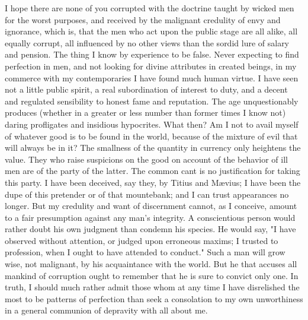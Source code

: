 I hope there are none of you corrupted with the doctrine taught by wicked men for the worst purposes, and received by the malignant credulity of envy and ignorance, which is, that the men who act upon the public stage are all alike, all equally corrupt, all influenced by no other views than the sordid lure of salary and pension. The thing I know by experience to be false. Never expecting to find perfection in men, and not looking for divine attributes in created beings, in my commerce with my contemporaries I have found much human virtue. I have seen not a little public spirit, a real subordination of interest to duty, and a decent and regulated sensibility to honest fame and reputation. The age unquestionably produces (whether in a greater or less number than former times I know not) daring profligates and insidious hypocrites. What then? Am I not to avail myself of whatever good is to be found in the world, because of the mixture of evil that will always be in it? The smallness of the quantity in currency only heightens the value. They who raise suspicions on the good on account of the behavior of ill men are of the party of the latter. The common cant is no justification for taking this party. I have been deceived, say they, by Titius and Mævius; I have been the dupe of this pretender or of that mountebank; and I can trust appearances no longer. But my credulity and want of discernment cannot, as I conceive, amount to a fair presumption against any man's integrity. A conscientious person would rather doubt his own judgment than condemn his species. He would say, "I have observed without attention, or judged upon erroneous maxims; I trusted to profession, when I ought to have attended to conduct." Such a man will grow wise, not malignant, by his acquaintance with the world. But he that accuses all mankind of corruption ought to remember that he is sure to convict only one. In truth, I should much rather admit those whom at any time I have disrelished the most to be patterns of perfection than seek a consolation to my own unworthiness in a general communion of depravity with all about me.

